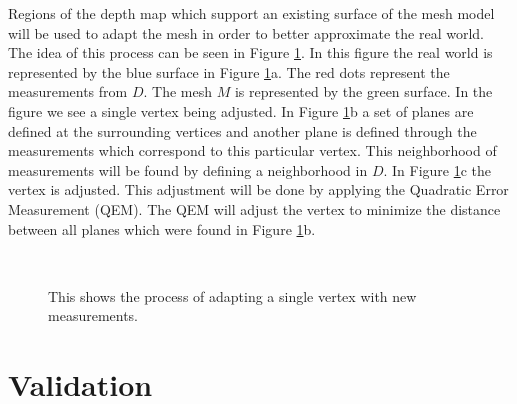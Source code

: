\documentclass[12pt]{article}
\begin{document}
Regions of the depth map which support an existing surface of the mesh
model will be used to adapt the mesh in order to better approximate the
real world. The idea of this process can be seen in Figure \ref{fig:AM}. In
this figure the real world is represented by the blue surface in Figure
\ref{fig:AM}a. The red dots represent the measurements from $D$. The mesh
$M$ is represented by the green surface. In the figure we see a single
vertex being adjusted. In Figure \ref{fig:AM}b a set of planes are defined
at the surrounding vertices and another plane is defined through the
measurements which correspond to this particular vertex. This neighborhood
of measurements will be found by defining a neighborhood in $D$. In Figure
\ref{fig:AM}c the vertex is adjusted. This adjustment will be done by
applying the Quadratic Error Measurement (QEM). The QEM will adjust the
vertex to minimize the distance between all planes which were found in
Figure \ref{fig:AM}b.    

\begin{figure}[h]
\centering
{} \quad
{} \quad
{} \\
\caption{This shows the process of adapting a single vertex with new
measurements. }
\label{fig:AM}
\end{figure}

\section{Validation}
\label{ch:validation}
\end{document}

